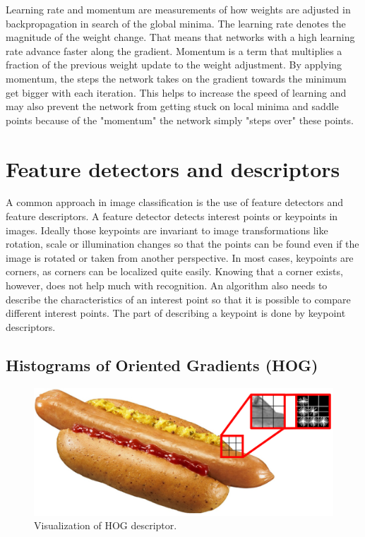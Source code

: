 Learning rate and momentum are measurements of how weights are adjusted in backpropagation in search of the global minima. The learning rate denotes the magnitude of the weight change. That means that networks with a high learning rate advance faster along the gradient. Momentum is a term that multiplies a fraction of the previous weight update to the weight adjustment. By applying momentum, the steps the network takes on the gradient towards the minimum get bigger with each iteration. This helps to increase the speed of learning and may also prevent the network from getting stuck on local minima and saddle points because of the "momentum" the network simply "steps over" these points.

\section{Feature detectors and descriptors}
A common approach in image classification is the use of feature detectors and feature descriptors. A feature detector detects interest points or keypoints in images. Ideally those keypoints are invariant to image transformations like rotation, scale or illumination changes so that the points can be found even if the image is rotated or taken from another perspective. In most cases, keypoints are corners, as corners can be localized quite easily. Knowing that a corner exists, however, does not help much with recognition. An algorithm also needs to describe the characteristics of an interest point so that it is possible to compare different interest points. The part of describing a keypoint is done by keypoint descriptors.

\subsection[HOG]{Histograms of Oriented Gradients (HOG)}
\begin{figure}
	\centering
	\includegraphics[scale=0.45]{data/images/theory/theoryHOG_VisualizationGradients}
	\caption{Visualization of HOG descriptor.}
	\label{fig:hogVisualization}
\end{figure}

